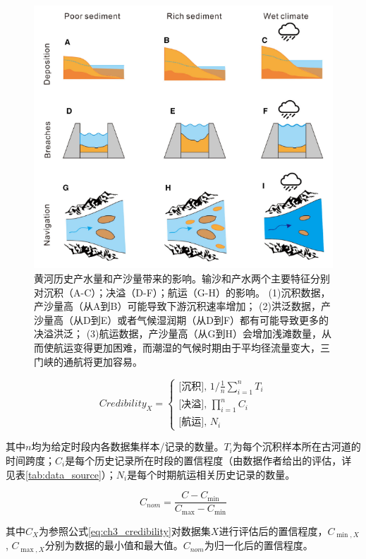 \begin{figure}[htb] %
    \centering
    \includegraphics[width=\textwidth]{img/ch3/ch3_impacts_diagram.png}
    \caption[黄河历史产水量和产沙量变化的影响]{黄河历史产水量和产沙量带来的影响。输沙和产水两个主要特征分别对沉积（A-C）；决溢（D-F）；航运（G-H）的影响。
    (1)沉积数据，产沙量高（从A到B）可能导致下游沉积速率增加\cite{xu2003a}；
    (2)洪泛数据，产沙量高（从D到E）或者气候湿润期（从D到F）都有可能导致更多的决溢洪泛\cite{chen2012}；
    (3)航运数据，产沙量高（从G到H）会增加浅滩数量，从而使航运变得更加困难，而潮湿的气候时期由于平均径流量变大，三门峡的通航将更加容易\cite{WangShouChun1993}。}\label{fig:ch3:impacts_diagram}
\end{figure}



\begin{equation}
    \label{eq:ch3_credibility}
    Credibility_X = 
    \left\{\begin{array}{l}
        \text{[沉积], } 1 / \frac{1}{n} \sum_{i=1}^n T_i\\
        \text{[决溢], } \prod_{i=1}^n C_i\\
        \text{[航运], } N_i
    \end{array}\right.
\end{equation}    

其中$n$均为给定时段内各数据集样本/记录的数量。$T_i$为每个沉积样本所在古河道的时间跨度；$C_i$是每个历史记录所在时段的置信程度（由数据作者给出的评估，详见表\ref{tab:data_source}）；$N_i$是每个时期航运相关历史记录的数量。

\begin{equation}
    \label{eq:ch3_normalize}
    C_{nom}=\frac{C-C_{\min}}{C_{\max}-C_{\min}}
\end{equation}

其中$C_{X}$为参照公式\ref{eq:ch3_credibility}对数据集$X$进行评估后的置信程度，$C_{\min, X}$, $C_{\max, X}$分别为数据的最小值和最大值。$C_{nom}$为归一化后的置信程度。
